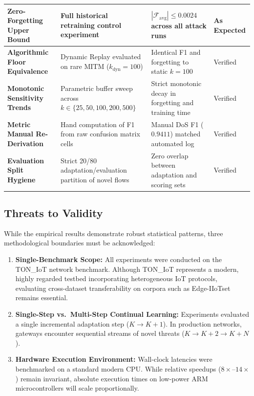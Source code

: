 \begin{table}[htbp]
{\begin{tabular}{|p{3.4cm}|p{4.2cm}|p{3.8cm}|p{1.8cm}|}
\textbf{Zero-Forgetting Upper Bound} & Full historical retraining control experiment & $|\mathcal{F}_{\text{avg}}| \le 0.0024$ across all attack runs & As Expected \\ \hline
\textbf{Algorithmic Floor Equivalence} & Dynamic Replay evaluated on rare MITM ($k_{\text{dyn}} = 100$) & Identical F1 and forgetting to static $k=100$ & Verified \\ \hline
\textbf{Monotonic Sensitivity Trends} & Parametric buffer sweep across $k \in \{25, 50, 100, 200, 500\}$ & Strict monotonic decay in forgetting and training time & Verified \\ \hline
\textbf{Metric Manual Re-Derivation} & Hand computation of F1 from raw confusion matrix cells & Manual DoS F1 ($0.9411$) matched automated log & Verified \\ \hline
\textbf{Evaluation Split Hygiene} & Strict 20/80 adaptation/evaluation partition of novel flows & Zero overlap between adaptation and scoring sets & Verified \\ \hline
\end{tabular}%
}
\end{table}

\subsection{Threats to Validity}
While the empirical results demonstrate robust statistical patterns, three methodological boundaries must be acknowledged:
\begin{enumerate}
    \item \textbf{Single-Benchmark Scope:} All experiments were conducted on the TON\_IoT network benchmark. Although TON\_IoT represents a modern, highly regarded testbed incorporating heterogeneous IoT protocols, evaluating cross-dataset transferability on corpora such as Edge-IIoTset remains essential.
    \item \textbf{Single-Step vs.\ Multi-Step Continual Learning:} Experiments evaluated a single incremental adaptation step ($K \to K+1$). In production networks, gateways encounter sequential streams of novel threats ($K \to K+2 \to K+N$).
    \item \textbf{Hardware Execution Environment:} Wall-clock latencies were benchmarked on a standard modern CPU. While relative speedups ($8\times\text{--}14\times$) remain invariant, absolute execution times on low-power ARM microcontrollers will scale proportionally.
\end{enumerate}


